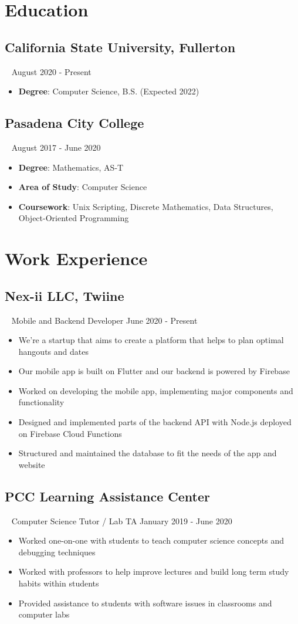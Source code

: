\documentclass{article}
\newcommand{\resumesection}[3]{
    \subsection*{#1}
    \ 
    \footnotesize
    \textcolor{csufgrey}{#2}
    \footnotesize
    \hfill
    \textcolor{csufgrey}{#3}
    \normalsize
}
\begin{document}
\pagestyle{useheader}

\section*{Education}
\resumesection{California State University, Fullerton}{}{August 2020 - Present}
\begin{itemize}
    \item \textbf{Degree}: Computer Science, B.S. (Expected 2022)
\end{itemize}
\resumesection{Pasadena City College}{}{August 2017 - June 2020}
\begin{itemize}
    \item \textbf{Degree}: Mathematics, AS-T
    \item \textbf{Area of Study}: Computer Science
    \item \textbf{Coursework}: Unix Scripting, Discrete Mathematics, Data Structures, Object-Oriented Programming
\end{itemize}
\hfill
\section*{Work Experience}
\resumesection{Nex-ii LLC, Twiine}{Mobile and Backend Developer}{June 2020 - Present}
\begin{itemize}
    \item We're a startup that aims to create a platform that helps to plan optimal hangouts and dates
    \item Our mobile app is built on Flutter and our backend is powered by Firebase
    \item Worked on developing the mobile app, implementing major components and functionality
    \item Designed and implemented parts of the backend API with Node.js deployed on Firebase Cloud Functions
    \item Structured and maintained the database to fit the needs of the app and website
\end{itemize}
\resumesection{PCC Learning Assistance Center}{Computer Science Tutor / Lab TA}{January 2019 - June 2020}
\begin{itemize}
    \item Worked one-on-one with students to teach computer science concepts and debugging techniques
    \item Worked with professors to help improve lectures and build long term study habits within students
    \item Provided assistance to students with software issues in classrooms and computer labs
\end{itemize}
\hfill
\end{document}
